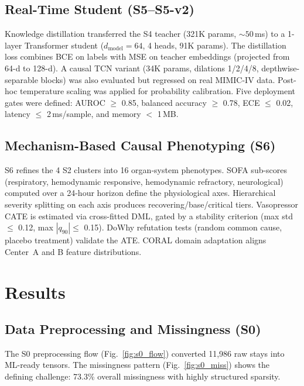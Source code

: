 \documentclass[conference,a4paper]{IEEEtran}
\begin{document}
\subsection{Real-Time Student (S5--S5-v2)}

Knowledge distillation transferred the S4 teacher (321K params, ${\sim}50$\,ms) to a 1-layer Transformer student ($d_\text{model}{=}64$, 4 heads, 91K params). The distillation loss combines BCE on labels with MSE on teacher embeddings (projected from 64-d to 128-d). A causal TCN variant (34K params, dilations 1/2/4/8, depthwise-separable blocks) was also evaluated but regressed on real MIMIC-IV data. Post-hoc temperature scaling was applied for probability calibration. Five deployment gates were defined: AUROC $\geq$ 0.85, balanced accuracy $\geq$ 0.78, ECE $\leq$ 0.02, latency $\leq$ 2\,ms/sample, and memory $<$ 1\,MB.

\subsection{Mechanism-Based Causal Phenotyping (S6)}

S6 refines the 4 S2 clusters into 16 organ-system phenotypes. SOFA sub-scores (respiratory, hemodynamic responsive, hemodynamic refractory, neurological) computed over a 24-hour horizon define the physiological axes. Hierarchical severity splitting on each axis produces recovering/base/critical tiers. Vasopressor CATE is estimated via cross-fitted DML, gated by a stability criterion (max std $\leq$ 0.12, max $|q_{90}| \leq$ 0.15). DoWhy refutation tests (random common cause, placebo treatment) validate the ATE. CORAL domain adaptation aligns Center~A and B feature distributions.


\section{Results}

\subsection{Data Preprocessing and Missingness (S0)}

The S0 preprocessing flow (Fig.~\ref{fig:s0_flow}) converted 11,986 raw stays into ML-ready tensors. The missingness pattern (Fig.~\ref{fig:s0_miss}) shows the defining challenge: 73.3\% overall missingness with highly structured sparsity.
\end{document}
